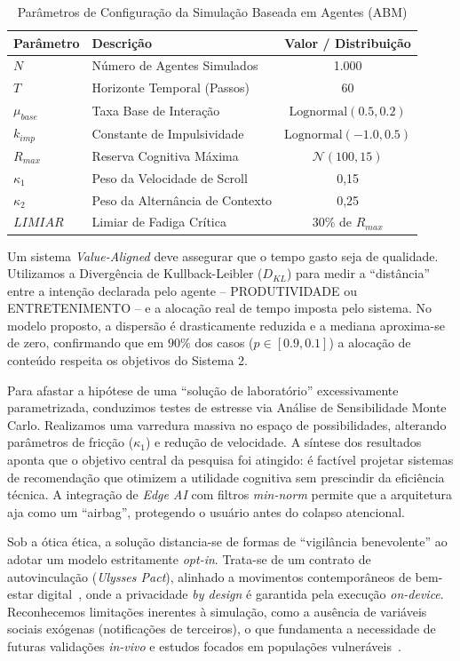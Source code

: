 \documentclass{sbc2023}
\begin{document}
\begin{table}[h]
\centering
\caption{Parâmetros de Configuração da Simulação Baseada em Agentes (ABM)}
\label{tab:parametros_abm}
\begin{tabular}{llc}
\hline
\textbf{Parâmetro} & \textbf{Descrição} & \textbf{Valor / Distribuição} \\ \hline
$N$ & Número de Agentes Simulados & 1.000 \\
$T$ & Horizonte Temporal (Passos) & 60 \\
$\mu_{base}$ & Taxa Base de Interação & $\text{Lognormal}(0.5, 0.2)$ \\
$k_{imp}$ & Constante de Impulsividade & $\text{Lognormal}(-1.0, 0.5)$ \\
$R_{max}$ & Reserva Cognitiva Máxima & $\mathcal{N}(100, 15)$ \\
$\kappa_1$ & Peso da Velocidade de Scroll & 0,15 \\
$\kappa_2$ & Peso da Alternância de Contexto & 0,25 \\
$LIMIAR$ & Limiar de Fadiga Crítica & 30\% de $R_{max}$ \\ \hline
\end{tabular}
\end{table}

Um sistema \textit{Value-Aligned} deve assegurar que o tempo gasto seja de qualidade. Utilizamos a Divergência de Kullback-Leibler ($D_{KL}$) para medir a ``distância'' entre a intenção declarada pelo agente -- PRODUTIVIDADE ou ENTRETENIMENTO -- e a alocação real de tempo imposta pelo sistema. No modelo proposto, a dispersão é drasticamente reduzida e a mediana aproxima-se de zero, confirmando que em $90\%$ dos casos ($p \in [0.9, 0.1]$) a alocação de conteúdo respeita os objetivos do Sistema 2.

Para afastar a hipótese de uma ``solução de laboratório'' excessivamente parametrizada, conduzimos testes de estresse via Análise de Sensibilidade Monte Carlo. Realizamos uma varredura massiva no espaço de possibilidades, alterando parâmetros de fricção ($\kappa_1$) e redução de velocidade. A síntese dos resultados aponta que o objetivo central da pesquisa foi atingido: é factível projetar sistemas de recomendação que otimizem a utilidade cognitiva sem prescindir da eficiência técnica. A integração de \textit{Edge AI} com filtros \textit{min-norm} permite que a arquitetura aja como um ``airbag'', protegendo o usuário antes do colapso atencional.

Sob a ótica ética, a solução distancia-se de formas de ``vigilância benevolente'' ao adotar um modelo estritamente \textit{opt-in}. Trata-se de um contrato de autovinculação (\textit{Ulysses Pact}), alinhado a movimentos contemporâneos de bem-estar digital~\citep{cht2026}, onde a privacidade \textit{by design} é garantida pela execução \textit{on-device}. Reconhecemos limitações inerentes à simulação, como a ausência de variáveis sociais exógenas (notificações de terceiros), o que fundamenta a necessidade de futuras validações \textit{in-vivo} e estudos focados em populações vulneráveis~\citep{lyngs2019, costello2023, brasil_sd}.
\end{document}

